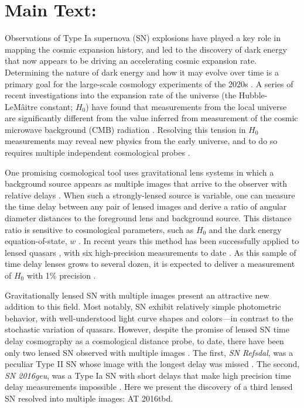 \documentclass[12pt]{article}
\def\SNABC{AT 2016tbd\xspace}
\begin{document}
\section*{Main Text:}

Observations of Type Ia supernova (SN) explosions have played a key role in mapping the cosmic expansion history, and led to the discovery of dark energy that now appears to be driving an accelerating cosmic expansion rate\cite{riess_observational_1998,perlmutter_measurements_1999, Riess_large_2019}.  Determining the nature of dark energy and how it may evolve over time is a primary goal for the large-scale cosmology experiments of the 2020s \cite{amendola_cosmology_2013,spergel_wide_2015,Ivezic_lsst_2019}.
A series of recent investigations into the expansion rate of the universe (the Hubble-LeM\^aitre constant; $H_0$) have found that measurements from the local universe are significantly different from the value inferred from measurement of the cosmic microwave background (CMB) radiation \cite{Riess_large_2019,aghanim_planck_2018}.  Resolving this tension in $H_0$ measurements may reveal new physics from the early universe, and to do so requires multiple 
independent cosmological probes \cite{verde_tensions_2019}.

One promising cosmological tool uses %
gravitational lens systems in which a background
source appears as multiple images that arrive to the observer with relative delays \cite{einstein_lens_1936}.
When such a strongly-lensed source is variable, one can measure the time delay between any pair of lensed images and derive a ratio of angular diameter distances to the foreground lens and background source. 
This distance ratio is sensitive to cosmological parameters, such as 
$H_0$  and the dark energy equation-of-state, $w$ \cite{refsdal_possibility_1964,coe_cosmological_2009,linder_lensing_2011}.
In recent years this method has been successfully applied to lensed
quasars \cite{suyu_cosmology_2014,bonvin_cosmograil_2019}, with six high-precision measurements to date \cite{wong_h0licow_2019}. As this sample of time delay lenses grows to several dozen, it is expected to deliver a measurement of $H_0$ with 1\% precision \cite{suyu_cosmological_2018}.  

Gravitationally lensed SN with multiple images present an attractive new addition to this field. Most notably, SN exhibit relatively simple photometric behavior, with well-understood light curve shapes and colors---in contrast to the stochastic variation of quasars.  However, despite the promise of lensed SN time delay cosmography as a cosmological distance probe, to date, there have been only two lensed SN observed with multiple images \cite{kelly_multiple_2015,goobar_iptf16geu:_2017}. The first, {\it SN Refsdal}, was a peculiar Type II SN whose image with the longest delay was missed \cite{kelly_sn_2016}. The second, {\it SN 2016geu}, was a Type Ia SN with short delays that make high precision time delay measurements impossible \cite{dhawan_magnification_2019}. Here we present the discovery 
of a third lensed SN resolved into multiple images: \SNABC. 
\end{document}
